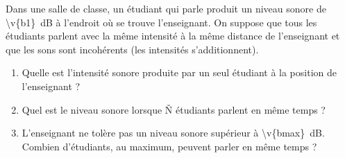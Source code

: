 Dans une salle de classe, un étudiant qui parle produit un niveau sonore de \qty{\v{b1}}{dB} à l'endroit où se trouve l'enseignant. On suppose que tous les étudiants parlent avec la même intensité à la même distance de l'enseignant et que les sons sont incohérents (les intensités s'additionnent).

\begin{enumerate}[label=\alph*)]
    \item Quelle est l'intensité sonore produite par un seul étudiant à la position de l'enseignant ?
    \item Quel est le niveau sonore lorsque \v{N} étudiants parlent en même temps ?
    \item L'enseignant ne tolère pas un niveau sonore supérieur à \qty{\v{bmax}}{dB}. Combien d'étudiants, au maximum, peuvent parler en même temps ?
\end{enumerate}
